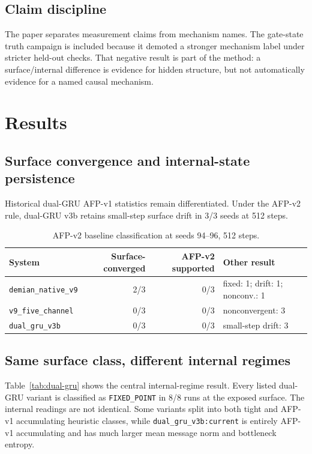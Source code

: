 \documentclass[11pt]{article}
\begin{document}
\subsection{Claim discipline}

The paper separates measurement claims from mechanism names. The gate-state
truth campaign is included because it demoted a stronger mechanism label under
stricter held-out checks. That negative result is part of the method: a
surface/internal difference is evidence for hidden structure, but not
automatically evidence for a named causal mechanism.

\section{Results}

\subsection{Surface convergence and internal-state persistence}

Historical dual-GRU AFP-v1 statistics remain differentiated. Under the AFP-v2
rule, dual-GRU v3b retains small-step surface drift in 3/3 seeds at 512 steps.

\begin{table}[H]
\centering
\small
\begin{tabular}{lrrl}
\toprule
System & Surface-converged & AFP-v2 supported & Other result \\
\midrule
\texttt{demian\_native\_v9} & 2/3 & 0/3 & fixed: 1; drift: 1; nonconv.: 1 \\
\texttt{v9\_five\_channel} & 0/3 & 0/3 & nonconvergent: 3 \\
\texttt{dual\_gru\_v3b} & 0/3 & 0/3 & small-step drift: 3 \\
\bottomrule
\end{tabular}
\caption{AFP-v2 baseline classification at seeds 94--96, 512 steps.}
\label{tab:afp-v2}
\end{table}

\subsection{Same surface class, different internal regimes}

Table~\ref{tab:dual-gru} shows the central internal-regime result. Every
listed dual-GRU variant is classified as \texttt{FIXED\_POINT} in 8/8 runs at
the exposed surface. The internal readings are not identical. Some variants
split into both tight and AFP-v1 accumulating heuristic classes, while
\texttt{dual\_gru\_v3b:current} is entirely AFP-v1 accumulating and has much larger
mean message norm and bottleneck entropy.
\end{document}
